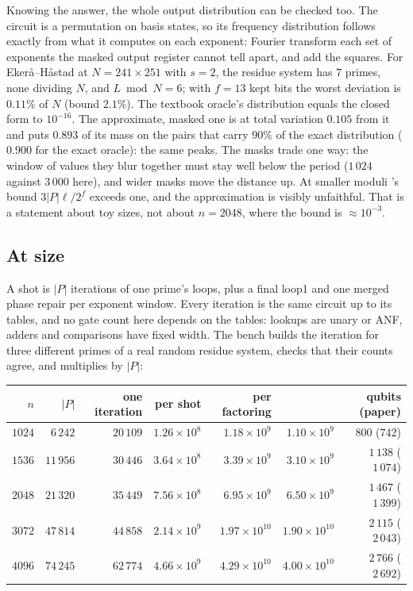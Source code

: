 \documentclass[11pt]{article}
\theoremstyle{plain}
\theoremstyle{remark}
\begin{document}
Knowing the answer, the whole output distribution can be checked too. The circuit is a permutation
on basis states, so its frequency distribution follows exactly from what it computes on each
exponent: Fourier transform each set of exponents the masked output register cannot tell apart,
and add the squares. For Eker\aa{}--H\aa{}stad at $N=241\times251$ with $s=2$, the residue system
has $7$ primes, none dividing $N$, and $L\bmod N=6$; with $f=13$ kept
bits the worst deviation is $0.11\%$ of $N$ (bound $2.1\%$). The textbook oracle's
distribution equals the closed form to $10^{-16}$. The approximate, masked one is at total variation
$0.105$ from it and puts $0.893$ of its mass on the pairs that carry $90\%$ of the exact
distribution ($0.900$ for the exact oracle): the same peaks. The masks trade one way: the
window of values they blur together must stay well below the period ($1\,024$ against
$3\,000$ here), and wider masks move the distance up. At smaller moduli
\cite{ec:gidney25rsa}'s bound $3|P|\ell/2^f$ exceeds one, and the approximation is visibly
unfaithful. That is a statement about toy sizes, not about $n=2048$, where the bound is
$\approx10^{-3}$.

\subsection{At size}

A shot is $|P|$ iterations of one prime's loops, plus a final loop1 and one merged phase repair
per exponent window. Every iteration is the same circuit up to its tables, and no gate count here
depends on the tables: lookups are unary or ANF, adders and comparisons have fixed width. The
bench builds the iteration for three different primes of a real random residue system, checks
that their counts agree, and multiplies by $|P|$:

\begin{center}\small
\begin{tabular}{rrrrrrr}
\toprule
$n$ & $|P|$ & one iteration & per shot & per factoring & \cite{ec:gidney25rsa} & qubits (paper)\\
\midrule
$1024$ & $6\,242$ & $20\,109$ & $1.26\times10^{8}$ & $1.18\times10^{9}$ & $1.10\times10^{9}$ & $800$ ($742$)\\
$1536$ & $11\,956$ & $30\,446$ & $3.64\times10^{8}$ & $3.39\times10^{9}$ & $3.10\times10^{9}$ & $1\,138$ ($1\,074$)\\
$2048$ & $21\,320$ & $35\,449$ & $7.56\times10^{8}$ & $6.95\times10^{9}$ & $6.50\times10^{9}$ & $1\,467$ ($1\,399$)\\
$3072$ & $47\,814$ & $44\,858$ & $2.14\times10^{9}$ & $1.97\times10^{10}$ & $1.90\times10^{10}$ & $2\,115$ ($2\,043$)\\
$4096$ & $74\,245$ & $62\,774$ & $4.66\times10^{9}$ & $4.29\times10^{10}$ & $4.00\times10^{10}$ & $2\,766$ ($2\,692$)\\
\bottomrule
\end{tabular}
\end{center}
\end{document}
